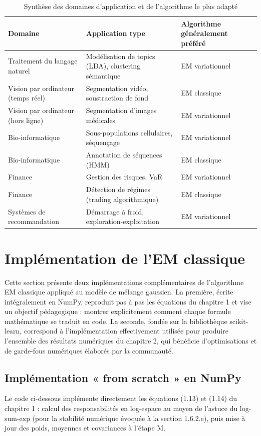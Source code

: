 \begin{table}[H]
\centering
\small
\setlength{\tabcolsep}{0.14cm}
\begin{tabular}{|p{4.84cm}|p{4.84cm}|p{4.84cm}|}
\hline
\textbf{Domaine} & \textbf{Application type} & \textbf{Algorithme généralement préféré} \\
\hline
Traitement du langage naturel & Modélisation de topics (LDA), clustering sémantique & EM variationnel \\
\hline
Vision par ordinateur (temps réel) & Segmentation vidéo, soustraction de fond & EM classique \\
\hline
Vision par ordinateur (hors ligne) & Segmentation d'images médicales & EM variationnel \\
\hline
Bio-informatique & Sous-populations cellulaires, séquençage & EM variationnel \\
\hline
Bio-informatique & Annotation de séquences (HMM) & EM classique \\
\hline
Finance & Gestion des risques, VaR & EM variationnel \\
\hline
Finance & Détection de régimes (trading algorithmique) & EM classique \\
\hline
Systèmes de recommandation & Démarrage à froid, exploration-exploitation & EM variationnel \\
\hline
\end{tabular}
\caption{Synthèse des domaines d'application et de l'algorithme le plus adapté}
\label{tab:3_1}
\end{table}
\section{Implémentation de l'EM classique}
Cette section présente deux implémentations complémentaires de l'algorithme EM classique appliqué au modèle de mélange gaussien. La première, écrite intégralement en NumPy, reproduit pas à pas les équations du chapitre 1 et vise un objectif pédagogique : montrer explicitement comment chaque formule mathématique se traduit en code. La seconde, fondée sur la bibliothèque scikit-learn, correspond à l'implémentation effectivement utilisée pour produire l'ensemble des résultats numériques du chapitre 2, qui bénéficie d'optimisations et de garde-fous numériques élaborés par la communauté.

\subsection{Implémentation « from scratch » en NumPy}
Le code ci-dessous implémente directement les équations (1.13) et (1.14) du chapitre 1 : calcul des responsabilités en log-espace au moyen de l'astuce du log-sum-exp (pour la stabilité numérique évoquée à la section 1.6.2.e), puis mise à jour des poids, moyennes et covariances à l'étape M.

